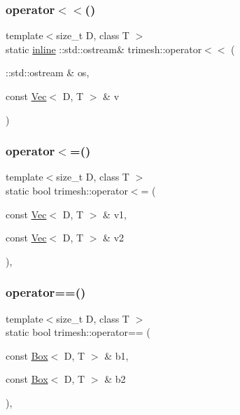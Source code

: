 \subsubsection{\texorpdfstring{operator$<$$<$()}{operator<<()}\hspace{0.1cm}{\footnotesize\ttfamily [2/2]}}
{\footnotesize\ttfamily template$<$size\+\_\+t D, class T $>$ \\
static \hyperlink{XForm_8h_a00d24c7231be28dbaf71f5408f30e44c}{inline} \+::std\+::ostream\& trimesh\+::operator$<$$<$ (\begin{DoxyParamCaption}\item[{\+::std\+::ostream \&}]{os,  }\item[{const \hyperlink{classtrimesh_1_1Vec}{Vec}$<$ D, T $>$ \&}]{v }\end{DoxyParamCaption})\hspace{0.3cm}{\ttfamily [static]}}

\mbox{\label{namespacetrimesh_a324b25b5107102b7e40fef345224feb7}} 
\subsubsection{\texorpdfstring{operator$<$=()}{operator<=()}}
{\footnotesize\ttfamily template$<$size\+\_\+t D, class T $>$ \\
static bool trimesh\+::operator$<$= (\begin{DoxyParamCaption}\item[{const \hyperlink{classtrimesh_1_1Vec}{Vec}$<$ D, T $>$ \&}]{v1,  }\item[{const \hyperlink{classtrimesh_1_1Vec}{Vec}$<$ D, T $>$ \&}]{v2 }\end{DoxyParamCaption})\hspace{0.3cm}{\ttfamily [inline]}, {\ttfamily [static]}}

\mbox{\label{namespacetrimesh_a86d58b3eb5fb30b3e4a2f877c80121d7}} 
\subsubsection{\texorpdfstring{operator==()}{operator==()}\hspace{0.1cm}{\footnotesize\ttfamily [1/3]}}
{\footnotesize\ttfamily template$<$size\+\_\+t D, class T $>$ \\
static bool trimesh\+::operator== (\begin{DoxyParamCaption}\item[{const \hyperlink{classtrimesh_1_1Box}{Box}$<$ D, T $>$ \&}]{b1,  }\item[{const \hyperlink{classtrimesh_1_1Box}{Box}$<$ D, T $>$ \&}]{b2 }\end{DoxyParamCaption})\hspace{0.3cm}{\ttfamily [inline]}, {\ttfamily [static]}}

